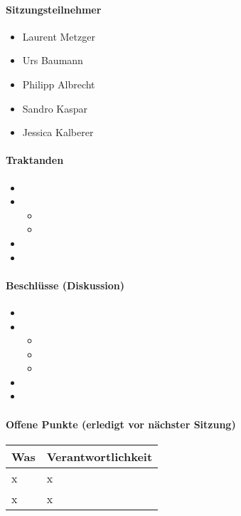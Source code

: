 \paragraph{Sitzungsteilnehmer}
\begin{itemize}	
	\item Laurent Metzger 
	\item Urs Baumann
	\item Philipp Albrecht
	\item Sandro Kaspar
	\item Jessica Kalberer
\end{itemize}

\paragraph{Traktanden}
\begin{itemize}	
	\item 
	\item 
	\begin{itemize}
		\item 
		\item 
	\end{itemize}
	\item 
	\item 
\end{itemize}

\paragraph{Beschlüsse (Diskussion)}
\begin{itemize}	
	\item 
	\item 
	\begin{itemize}
		\item 
		\item 
		\item 
	\end{itemize}
	\item 
	\item 
\end{itemize}

\paragraph{Offene Punkte (erledigt vor nächster Sitzung)} \mbox{}

\begin{table}[H]
	\centering
	\begin{tabularx}{\textwidth}{X | p{4.5cm}}
		\rowcolor{gray!50}
		\textbf{Was} & \textbf{Verantwortlichkeit} \\
		\hline
		x & x \\
		x & x \\
	\end{tabularx}
	\label{tab:my-label}
\end{table}


